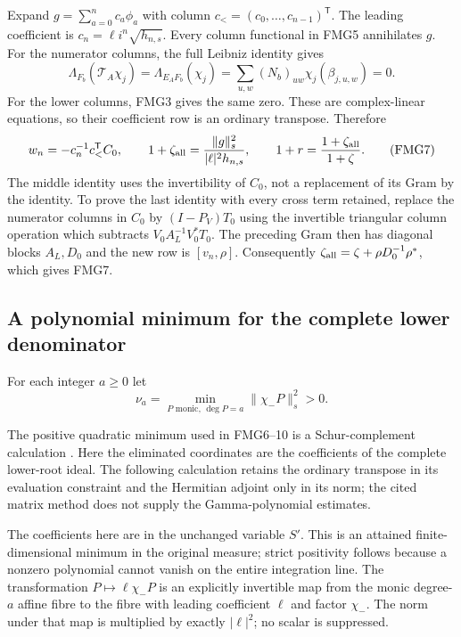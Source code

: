 \documentclass[11pt,a4paper]{article}
\begin{document}
Expand $g=\sum_{a=0}^n c_a\phi_a$ with column
$c_<=(c_0,\ldots,c_{n-1})^{\mathsf T}$. The leading coefficient is
$c_n=\ell i^n\sqrt{h_{n,s}}$. Every column functional in FMG5
annihilates $g$. For the numerator columns, the full Leibniz identity
gives
\[
 \Lambda_{F_b}(\mathcal T_A\chi_j)
   =\Lambda_{E_AF_b}(\chi_j)
   =\sum_{u,w}(N_b)_{uw}\chi_j(\beta_{j,u,w})=0.
\]
For the lower columns, FMG3 gives the same zero. These are
complex-linear equations, so their coefficient row is an ordinary
transpose. Therefore
\[
 w_n=-c_n^{-1}c_<^{\mathsf T}C_0,\qquad
 1+\zeta_{\rm all}=\frac{\|g\|_s^2}{|\ell|^2h_{n,s}},\qquad
 1+r=\frac{1+\zeta_{\rm all}}{1+\zeta}.
                                                               \tag{FMG7}
\]
The middle identity uses the invertibility of $C_0$, not a
replacement of its Gram by the identity. To prove the last
identity with every cross term retained, replace the numerator
columns in $C_0$ by $(I-P_V)T_0$ using the invertible triangular
column operation which subtracts $V_0A_L^{-1}V_0^*T_0$.
The preceding Gram then has diagonal blocks $A_L,D_0$ and the new
row is $[v_n,\rho]$. Consequently
$\zeta_{\rm all}=\zeta+\rho D_0^{-1}\rho^*$, which gives FMG7.

\subsection{A polynomial minimum for the complete lower denominator}
For each integer $a\ge0$ let
\[
 \nu_a=\min_{P\text{ monic},\,\deg P=a}
                  \|\chi_-P\|_s^2>0.
                                                               \tag{FMG8}
\]


The positive quadratic minimum used in FMG6--10 is a Schur-complement
calculation \cite[\S2.1, (2.3)--(2.4)]{human:boyd1994}.
Here the eliminated coordinates are the coefficients of the complete
lower-root ideal. The following calculation retains the ordinary
transpose in its evaluation constraint and the Hermitian adjoint
only in its norm; the cited matrix method does not supply the
Gamma-polynomial estimates.

The coefficients here are in the unchanged variable $S'$.
This is an attained finite-dimensional minimum in the original
measure; strict positivity follows because a nonzero polynomial
cannot vanish on the entire integration line. The transformation
$P\mapsto\ell\chi_-P$ is an explicitly invertible map from the
monic degree-$a$ affine fibre to the fibre with leading coefficient
$\ell$ and factor $\chi_-$. The norm under that map is multiplied
by exactly $|\ell|^2$; no scalar is suppressed.
\end{document}
